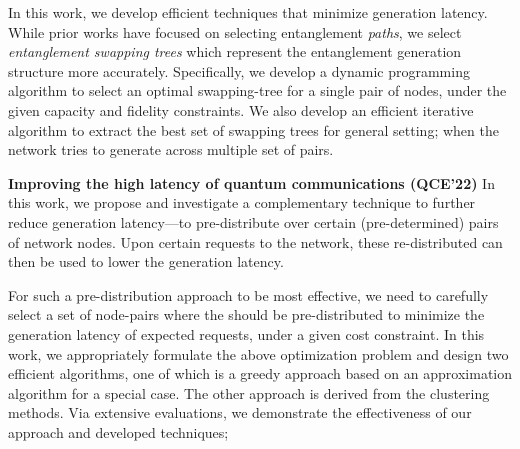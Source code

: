 In this work, we develop efficient techniques that minimize \eps generation latency. While prior works
have focused on selecting entanglement \textit{paths}, we select \emph{entanglement swapping trees} which represent the entanglement generation structure more accurately.
Specifically, we develop a dynamic programming algorithm to select an optimal swapping-tree for a single pair of nodes, under the given capacity and fidelity constraints.
We also develop an efficient iterative algorithm to extract the best set of swapping trees for general setting; when the network tries to generate \epss across multiple set of pairs.



\vspace{6pt}\noindent \textbf{Improving the high latency of quantum communications (QCE'22)}
In this work, we propose and investigate a complementary technique to further reduce \eps generation latency---to pre-distribute \epss over certain (pre-determined) pairs of network nodes. 
Upon certain requests to the network, these re-distributed \epss can then be used to lower the generation latency.

For such a pre-distribution approach to be most effective, we need to carefully select a set of node-pairs where
the \epss should be pre-distributed to minimize the generation latency of expected \eps requests, under a given cost constraint.
In this work,
we appropriately formulate the above optimization problem and design two
efficient algorithms, one of which is a greedy approach based on an 
approximation algorithm for a special case. 
The other approach is derived from the clustering methods.
Via extensive evaluations, we demonstrate the effectiveness of our approach and developed techniques;  



